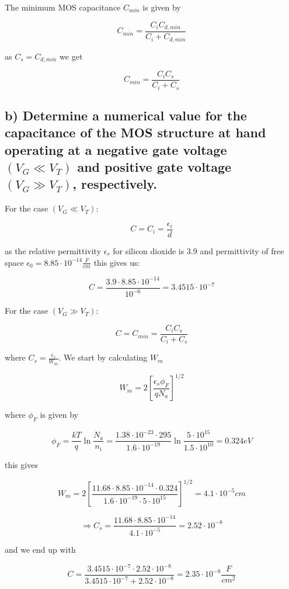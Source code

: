 The minimum MOS capacitance $C_{min}$ is given by 

$$C_{min}= \frac{C_iC_{d,min}}{C_i+C_{d,min}}$$

as $C_s=C_{d,min}$ we get

$$C_{min}= \frac{C_iC_{s}}{C_i+C_{s}}$$

\subsection*{b) Determine a numerical value for the capacitance of the MOS structure at hand operating at a negative gate voltage $\left(V_G \ll V_T\right)$ and positive gate voltage $\left(V_G \gg V_T\right)$, respectively.}

For the case  $\left(V_G \ll V_T\right)$:

$$C=C_i=\frac{\epsilon_i}{d}$$

as the relative permittivity $\epsilon_r$ for silicon dioxide is 3.9 and permittivity of free space $\epsilon_0=8.85\cdot10^{-14}\frac{F}{cm}$ this gives us:

$$C=\frac{3.9\cdot8.85\cdot10^{-14}}{10^{-6}}=3.4515\cdot 10^{-7}$$

For the case  $\left(V_G \gg V_T\right)$:

$$C=C_{min}= \frac{C_iC_{s}}{C_i+C_{s}}$$

where $C_s=\frac{\epsilon_s}{W_m}$. We start by calculating $W_m$


$$W_m=2\left[\frac{ \epsilon_s \phi_F}{q N_a}\right]^{1 / 2}$$

where $\phi_F$ is given by

$$\phi_F=\frac{kT}{q}\ln \frac{N_a}{n_i}= \frac{1.38\cdot10^{-23}\cdot295}{1.6\cdot10^{-19}}\ln \frac{5\cdot10^{15}}{1.5\cdot10^{10}}=0.324eV$$

this gives

$$W_m=2\left[\frac{11.68\cdot8.85\cdot10^{-14} \cdot 0.324}{1.6\cdot10^{-19} \cdot5\cdot10^{15}}\right]^{1 / 2}=4.1\cdot10^{-5}cm$$

$$\Rightarrow C_s=\frac{11.68\cdot8.85\cdot10^{-14}}{4.1\cdot10^{-5}}=2.52\cdot10^{-8}$$

and we end up with

$$C= \frac{3.4515\cdot 10^{-7}\cdot2.52\cdot10^{-8}}{3.4515\cdot 10^{-7}+2.52\cdot10^{-8}}=2.35\cdot10^{-8}\frac{F}{cm^2}$$

